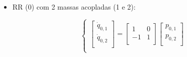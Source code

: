 \begin{itemize}
\item RR (0) com 2 massas acopladas (1 e 2):

\begin{equation}
	\begin{cases}

	\begin{bmatrix}
	\dot{q}_{0,1} \\
	\dot{q}_{0,2} \\
	\end{bmatrix}
	=
	\begin{bmatrix}
	1 & 0 \\
	-1 & 1\\
	\end{bmatrix}
	\begin{bmatrix}
	p_{0,1} \\
	p_{0,2} \\
	\end{bmatrix} \\


\end{cases}
\end{equation}
\end{itemize}
